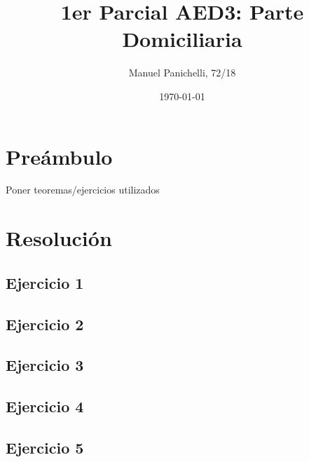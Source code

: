 \documentclass[12pt, a4paper]{report}
\title{1er Parcial AED3: Parte Domiciliaria}
\author{Manuel Panichelli, 72/18}
\date{\today}
\begin{document}
\maketitle
\newpage

\chapter*{Preámbulo}

Poner teoremas/ejercicios utilizados

\chapter*{Resolución}

\section*{Ejercicio 1}

\section*{Ejercicio 2}

\section*{Ejercicio 3}

\section*{Ejercicio 4}

\section*{Ejercicio 5}
\end{document}

